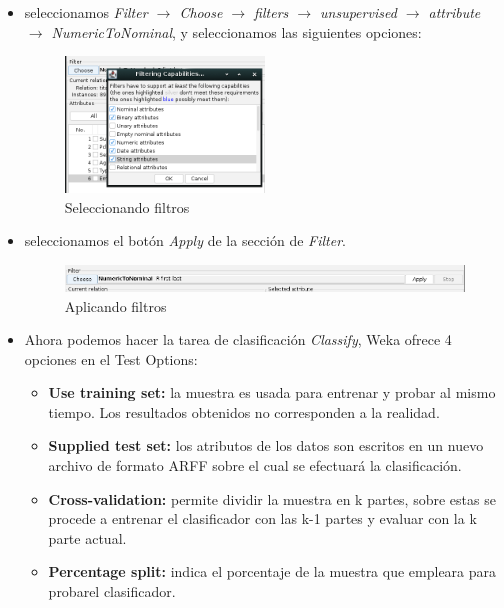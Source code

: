 \documentclass[12pt]{article}
\begin{document}
\begin{itemize}
                    \item seleccionamos \textit{Filter $\rightarrow$ Choose $\rightarrow$ filters $\rightarrow$ unsupervised $\rightarrow$ attribute $\rightarrow$ NumericToNominal}, y seleccionamos las siguientes opciones:
                    \newpage
                    \begin{figure}[!h]
                        \centering
                        \includegraphics[width=0.5\textwidth]{img/weka-6.png}
                        \caption{Seleccionando filtros}
                    \end{figure}
                    
                    \item seleccionamos el botón \textit{Apply} de la sección de \textit{Filter}.
                        \begin{figure}[!h]
                            \centering
                            \includegraphics[width=1\textwidth]{img/weka-7.png}
                            \caption{Aplicando filtros}
                        \end{figure}
                    
                    \item Ahora podemos hacer la tarea de clasificación \textit{Classify}, Weka ofrece 4 opciones en el Test Options:
                        \begin{itemize}
                            \item \textbf{Use training set:} la muestra es usada para entrenar y probar al mismo tiempo. Los resultados obtenidos no corresponden a la realidad.
                            \item \textbf{Supplied test set:} los atributos de los datos son escritos en un nuevo archivo de formato ARFF sobre el cual se efectuará la clasificación.
                            \item \textbf{Cross-validation:} permite dividir la muestra en k partes, sobre estas se  procede a entrenar el clasificador con las k-1 partes y evaluar con la k parte actual.
                            \item \textbf{Percentage split:} indica el porcentaje de la muestra que empleara para probarel clasificador. 
                        \end{itemize}
                    

\end{itemize}
\end{document}
